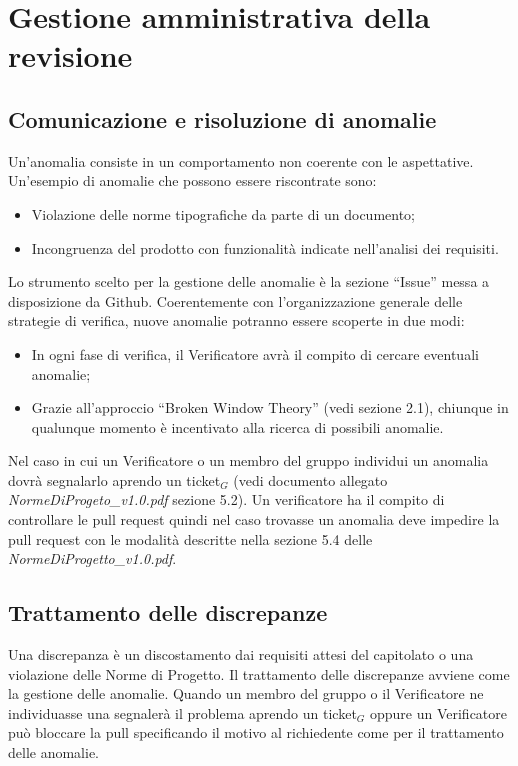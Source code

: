 \section{Gestione amministrativa della revisione}
\subsection{Comunicazione e risoluzione di anomalie}
Un'anomalia consiste in un comportamento non coerente con le aspettative. Un'esempio di anomalie che possono essere riscontrate sono:
\begin{itemize}
	\item Violazione delle norme tipografiche da parte di un documento;
	\item Incongruenza del prodotto con funzionalità indicate nell'analisi dei requisiti.
\end{itemize}
Lo strumento scelto per la gestione delle anomalie è la sezione “Issue” messa a disposizione da Github. Coerentemente con l'organizzazione generale delle strategie di verifica, nuove anomalie potranno essere scoperte in due modi:

\begin{itemize}
	\item In ogni fase di verifica, il Verificatore avrà il compito di cercare eventuali anomalie;
	\item Grazie all'approccio “Broken Window Theory” (vedi sezione 2.1), chiunque in qualunque momento è incentivato alla ricerca di possibili anomalie.
\end{itemize}
Nel caso in cui un Verificatore o un membro del gruppo individui un anomalia dovrà segnalarlo aprendo un ticket$_G$ (vedi documento allegato \textit{NormeDiProgeto\_v1.0.pdf} sezione 5.2). Un verificatore ha il compito di controllare le pull request quindi nel caso trovasse un anomalia deve impedire la pull request con le modalità descritte nella sezione 5.4 delle \textit{NormeDiProgetto\_v1.0.pdf}.

\subsection{Trattamento delle discrepanze}
Una discrepanza è un discostamento dai requisiti attesi del capitolato o una violazione delle Norme di Progetto. Il trattamento delle discrepanze avviene come la gestione delle anomalie. Quando un membro del gruppo o il Verificatore ne individuasse una segnalerà il problema aprendo un ticket$_G$ oppure un Verificatore può bloccare la pull specificando il motivo al richiedente come per il trattamento delle anomalie.
